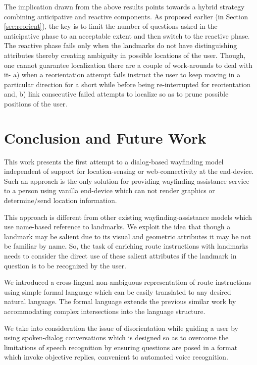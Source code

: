 \documentclass{iitkthesis}
\begin{document}
The implication drawn from the above results points towards a hybrid 
strategy combining anticipative and reactive components. As proposed earlier
(in Section \ref{sec:reorient}), the key is to limit the number of 
questions asked in the anticipative phase to an acceptable extent and then 
switch to the reactive phase. The reactive phase fails only when the 
landmarks do not have distinguishing attributes thereby creating ambiguity in 
possible locations of the user. Though, one cannot guarantee localization 
there are a couple of work-arounds to deal with it- a) when a 
reorientation attempt fails instruct the user to keep moving in a 
particular direction for a short while before being re-interrupted for 
reorientation and, b) link consecutive failed attempts to localize 
so as to prune possible positions of the user. 
 
 \chapter{Conclusion and Future Work}
This work presents the first attempt to a dialog-based wayfinding model independent of support for location-sensing or web-connectivity at the end-device. Such an approach is the only solution for providing wayfinding-assistance service to a person using vanilla end-device which can not render graphics or determine/send location information. 

This approach is different from other existing wayfinding-assistance 
models which use name-based reference to landmarks. We exploit the
idea that though a landmark may be salient due to its visual and geometric 
attributes it may be not be familiar by name. So,
the task of enriching route instructions with landmarks needs to consider 
the direct use of these salient attributes if the landmark in question 
is to be recognized by the user. 


We introduced a cross-lingual non-ambiguous representation of route instructions using simple formal language which can be easily translated to any desired natural language. The formal language extends the previous similar work by accommodating complex intersections into the language structure.

We take into consideration the issue of disorientation while guiding a user by using spoken-dialog conversations which is designed so as to overcome the limitations of speech recognition by ensuring questions are posed in a format which invoke objective replies, convenient to automated voice recognition.
\end{document}
